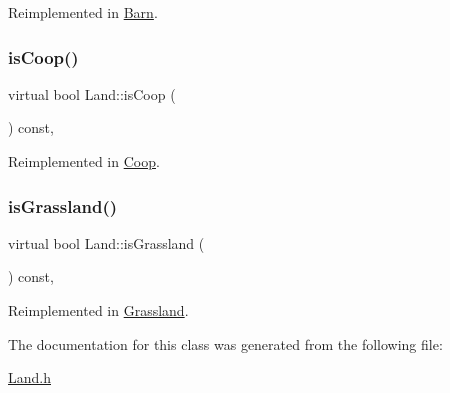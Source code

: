 Reimplemented in \mbox{\hyperlink{classBarn_a716f3e1ecf4d4d37fe934d29425841a1}{Barn}}.

\mbox{\label{classLand_a685f9ec0e771dbf0fe348dd13d467c4e}} 
\subsubsection{\texorpdfstring{isCoop()}{isCoop()}}
{\footnotesize\ttfamily virtual bool Land\+::is\+Coop (\begin{DoxyParamCaption}{ }\end{DoxyParamCaption}) const\hspace{0.3cm}{\ttfamily [inline]}, {\ttfamily [virtual]}}



Reimplemented in \mbox{\hyperlink{classCoop_af611b31347d3a8cf2304af22ecbfc450}{Coop}}.

\mbox{\label{classLand_aa79c16746d74c0493e66ce73f2fa0e0f}} 
\subsubsection{\texorpdfstring{isGrassland()}{isGrassland()}}
{\footnotesize\ttfamily virtual bool Land\+::is\+Grassland (\begin{DoxyParamCaption}{ }\end{DoxyParamCaption}) const\hspace{0.3cm}{\ttfamily [inline]}, {\ttfamily [virtual]}}



Reimplemented in \mbox{\hyperlink{classGrassland_ac4f00629f20061d2ec9f792a42f7315c}{Grassland}}.



The documentation for this class was generated from the following file\+:\begin{DoxyCompactItemize}
\item 
\mbox{\hyperlink{Land_8h}{Land.\+h}}\end{DoxyCompactItemize}
